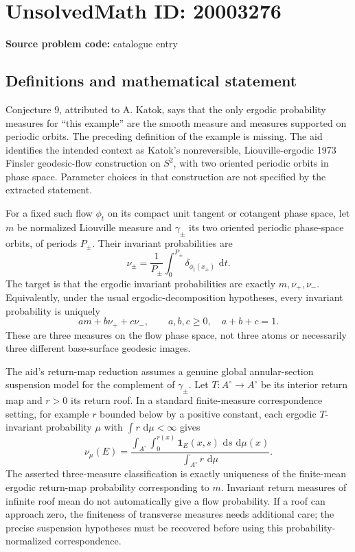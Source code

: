\documentclass[11pt]{article}
\newcommand{\dd}{\,\mathrm{d}}
\begin{document}
\section*{UnsolvedMath ID: 20003276}
\textbf{Source problem code:} catalogue entry
\subsection{Definitions and mathematical statement}
Conjecture 9, attributed to A. Katok, says that the only ergodic probability measures for ``this example'' are the smooth measure and measures supported on periodic orbits. The preceding definition of the example is missing. The aid identifies the intended context as Katok's nonreversible, Liouville-ergodic 1973 Finsler geodesic-flow construction on $S^2$, with two oriented periodic orbits in phase space. Parameter choices in that construction are not specified by the extracted statement.

For a fixed such flow $\phi_t$ on its compact unit tangent or cotangent phase space, let $m$ be normalized Liouville measure and $\gamma_\pm$ its two oriented periodic phase-space orbits, of periods $P_\pm$. Their invariant probabilities are
\[
\nu_\pm=\frac1{P_\pm}\int_0^{P_\pm}\delta_{\phi_t(x_\pm)}\,\dd t.
\]
The target is that the ergodic invariant probabilities are exactly $m,\nu_+,\nu_-$. Equivalently, under the usual ergodic-decomposition hypotheses, every invariant probability is uniquely
\[
a m+b\nu_++c\nu_-,\qquad a,b,c\geq0,\quad a+b+c=1.
\]
These are three measures on the flow phase space, not three atoms or necessarily three different base-surface geodesic images.

The aid's return-map reduction assumes a genuine global annular-section suspension model for the complement of $\gamma_\pm$. Let $T:A^\circ\to A^\circ$ be its interior return map and $r>0$ its return roof. In a standard finite-measure correspondence setting, for example $r$ bounded below by a positive constant, each ergodic $T$-invariant probability $\mu$ with $\int r\,\dd\mu<\infty$ gives
\[
\nu_\mu(E)=\frac{\displaystyle\int_{A^\circ}\int_0^{r(x)}\mathbf1_E(x,s)\,\dd s\,\dd\mu(x)}{\displaystyle\int_{A^\circ}r\,\dd\mu}.
\]
The asserted three-measure classification is exactly uniqueness of the finite-mean ergodic return-map probability corresponding to $m$. Invariant return measures of infinite roof mean do not automatically give a flow probability. If a roof can approach zero, the finiteness of transverse measures needs additional care; the precise suspension hypotheses must be recovered before using this probability-normalized correspondence.
\end{document}
